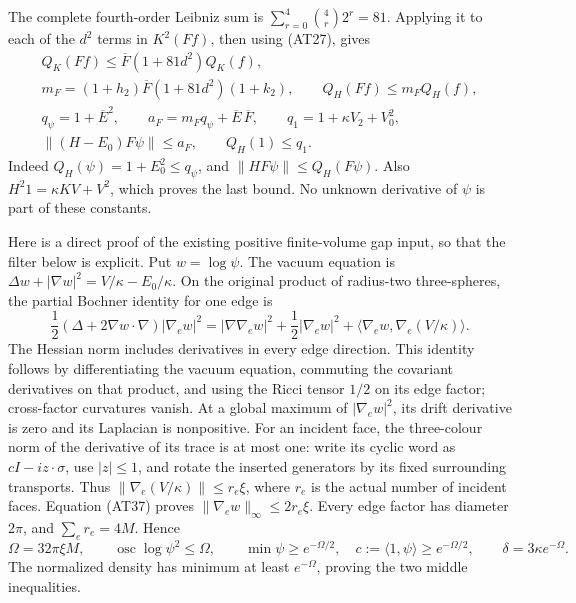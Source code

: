 \documentclass[11pt]{article}
\begin{document}
The complete fourth-order Leibniz sum is
\(\sum_{r=0}^4\binom4r2^r=81\). Applying it to each of the \(d^2\) terms in \(K^2(Ff)\), then using (AT27), gives
\[
 \begin{gathered}
 Q_K(Ff)\le\overline F(1+81d^2)Q_K(f),\\
 m_F=(1+h_2)\overline F(1+81d^2)(1+k_2),\qquad
 Q_H(Ff)\le m_F Q_H(f),\\
 q_\psi=1+\overline E^2,\qquad
 a_F=m_Fq_\psi+\overline E\,\overline F,\qquad
 q_1=1+\kappa V_2+V_0^2,\\
 \|(H-E_0)F\psi\|\le a_F,\qquad Q_H(1)\le q_1.
 \end{gathered}\tag{AT36}
\]
Indeed \(Q_H(\psi)=1+E_0^2\le q_\psi\), and
\(\|HF\psi\|\le Q_H(F\psi)\).
Also \(H^2 1=\kappa KV+V^2\), which proves the last bound. No unknown derivative of \(\psi\) is part of these constants.

Here is a direct proof of the existing positive finite-volume gap input, so that the filter below is explicit. Put \(w=\log\psi\). The vacuum equation is
\(\Delta w+|\nabla w|^2=V/\kappa-E_0/\kappa\).
On the original product of radius-two three-spheres, the partial Bochner identity for one edge is
\[
 \frac12(\Delta+2\nabla w\cdot\nabla)|\nabla_e w|^2
   =|\nabla\nabla_e w|^2+\frac12|\nabla_e w|^2
                     +\langle\nabla_e w,\nabla_e(V/\kappa)\rangle .
 \tag{AT37}
\]
The Hessian norm includes derivatives in every edge direction. This identity follows by differentiating the vacuum equation, commuting the covariant derivatives on that product, and using the Ricci tensor \(1/2\) on its edge factor; cross-factor curvatures vanish. At a global maximum of \(|\nabla_e w|^2\), its drift derivative is zero and its Laplacian is nonpositive. For an incident face, the three-colour norm of the derivative of its trace is at most one: write its cyclic word as \(cI-i z\cdot\sigma\), use \(|z|\le1\), and rotate the inserted generators by its fixed surrounding transports. Thus
\(\|\nabla_e(V/\kappa)\|\le r_e\xi\), where \(r_e\) is the actual number of incident faces. Equation (AT37) proves
\(\|\nabla_e w\|_\infty\le2r_e\xi\).
Every edge factor has diameter \(2\pi\), and \(\sum_er_e=4M\). Hence
\[
 \Omega=32\pi\xi M,\qquad
 \operatorname{osc}\log\psi^2\le\Omega,\qquad
 \min\psi\ge e^{-\Omega/2},\quad
 c:=\langle1,\psi\rangle\ge e^{-\Omega/2},\qquad
 \delta=3\kappa e^{-\Omega}.
 \tag{AT38}
\]
The normalized density has minimum at least \(e^{-\Omega}\), proving the two middle inequalities.
\end{document}
